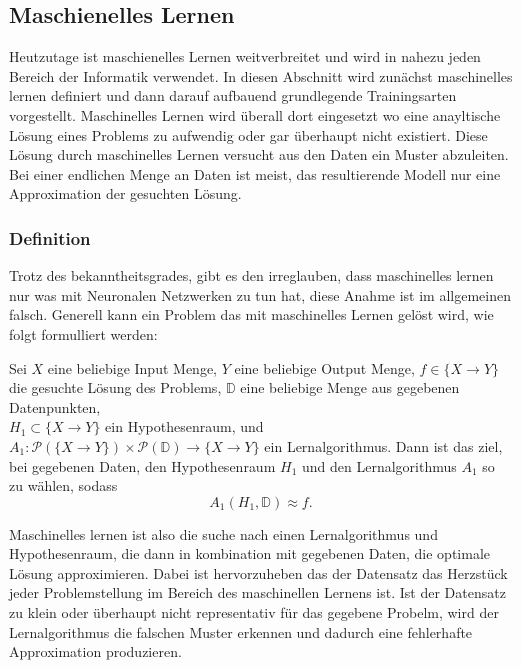 \documentclass[12pt,letterpaper,ngerman]{article}
\begin{document}
\subsection{Maschienelles Lernen}
Heutzutage ist maschienelles Lernen weitverbreitet und wird in nahezu jeden
Bereich der Informatik verwendet.
In diesen Abschnitt wird zunächst maschinelles lernen definiert und 
dann darauf aufbauend grundlegende Trainingsarten vorgestellt.
Maschinelles Lernen wird überall dort eingesetzt
wo eine anayltische Lösung eines Problems zu aufwendig oder gar überhaupt nicht
existiert. %
Diese Lösung durch maschinelles Lernen versucht aus den Daten ein Muster
abzuleiten. Bei einer endlichen Menge an Daten ist meist,
das resultierende Modell nur eine Approximation der gesuchten Lösung.
\subsubsection{Definition}
Trotz des bekanntheitsgrades, gibt es den irreglauben, dass
maschinelles lernen nur was mit Neuronalen Netzwerken zu tun
hat, diese Anahme ist im allgemeinen falsch. Generell kann
ein Problem das mit maschinelles Lernen gelöst wird, wie folgt 
formulliert werden:
\begin{definition}
  Sei $X$ eine beliebige Input Menge, $Y$ eine beliebige Output Menge,
  $f \in \{X \to Y\}$ die gesuchte Lösung des Problems, 
  $\mathbb{D}$ eine beliebige Menge aus gegebenen Datenpunkten,\\
  $H_1 \subset \{X \to Y\}$ ein Hypothesenraum, und 
  $A_1: \mathcal{P}(\{X \to Y\}) \times 
  \mathcal{P}(\mathbb{D}) \to \{ X \to Y \} $
  ein Lernalgorithmus. Dann ist das ziel, bei gegebenen Daten,
  den Hypothesenraum $H_1$ und den Lernalgorithmus $A_1$ so zu wählen,
  sodass
  \[
    A_1(H_1, \mathbb{D}) \approx f.
  \]
\end{definition}
Maschinelles lernen ist also die suche nach einen Lernalgorithmus und 
Hypothesenraum, die dann in kombination mit gegebenen Daten, die optimale
Lösung approximieren. Dabei ist hervorzuheben das der Datensatz das Herzstück
jeder Problemstellung im Bereich des maschinellen Lernens ist. Ist der 
Datensatz zu klein oder überhaupt nicht representativ für das gegebene
Probelm, wird der Lernalgorithmus die falschen Muster erkennen und dadurch
eine fehlerhafte Approximation produzieren. %
\end{document}

